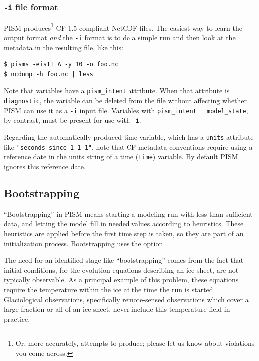 \documentclass[titlepage,letterpaper,final]{scrartcl}
\begin{document}
\subsubsection*{\texttt{-i} file format}
\label{sec:i-format}
PISM produces\footnote{Or, more accurately, attempts to produce; please let us know about violations you come across.} CF-1.5 compliant NetCDF files.  The easiest way to learn the output format \emph{and} the \texttt{-i} format is to do a simple run and then look at the metadata in the resulting file, like this:
\begin{verbatim}
$ pisms -eisII A -y 10 -o foo.nc
$ ncdump -h foo.nc | less
\end{verbatim}

Note that variables have a \texttt{pism_intent} attribute.  When that attribute is \texttt{diagnostic}, the variable can be deleted from the file without affecting whether PISM can use it as a \texttt{-i} input file.  Variables with \texttt{pism_intent} = \texttt{model_state}, by contrast, must be present for use with \texttt{-i}.

Regarding the automatically produced time variable, which has a \texttt{units} attribute like \texttt{"seconds since 1-1-1"}, note that CF metadata conventions require using a reference date in the units string of a time (\texttt{time}) variable. By default PISM ignores this reference date.


\subsection{Bootstrapping}
\label{sec:bootstrapping}

``Bootstrapping'' in PISM means starting a modeling run with less than sufficient data, and letting the model fill in needed values according to heuristics.  These heuristics are applied before the first time step is taken, so they are part of an initialization process.  Bootstrapping uses the option .

The need for an identified stage like ``bootstrapping'' comes from the fact that initial conditions, for the evolution equations describing an ice sheet, are not typically observable.  As a principal example of this problem, these equations require the temperature within the ice at the time the run is started.  Glaciological observations, specifically remote-sensed observations which cover a large fraction or all of an ice sheet, never include this temperature field in practice.
\end{document}
